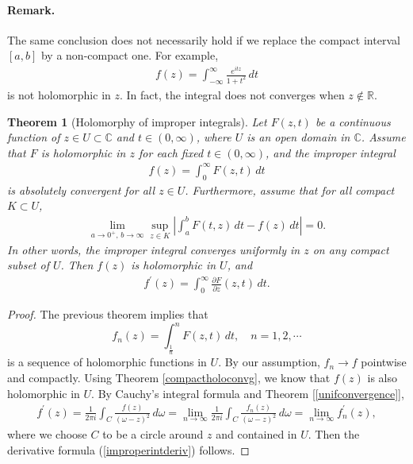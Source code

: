 \documentclass{article}
\numberwithin{equation}{section}
\newcommand{\bbC}{\mathbb{C}}
\newcommand{\bbR}{\mathbb{R}}
\theoremstyle{plain}
\newtheorem{theorem}{Theorem}[section]
\theoremstyle{definition}
\begin{document}
\paragraph{Remark.} The same conclusion does not necessarily hold if we replace the compact interval $[a,b]$ by a non-compact one. For example,
\begin{align*}
	f(z)=\int_{-\infty}^\infty\frac{e^{itz}}{1+t^2}\,dt
\end{align*}
is not holomorphic in $z$. In fact, the integral does not converges when $z\notin \bbR$.
\begin{theorem}[Holomorphy of improper integrals]\label{compactconvgint}
Let $F(z,t)$ be a continuous function of $z\in U\subset\bbC$ and $t\in(0,\infty)$, where $U$ is an open domain in $\bbC$. Assume that $F$ is holomorphic in $z$ for each fixed $t\in(0,\infty)$, and the improper integral
\begin{align*}
	f(z)=\int_0^\infty F(z,t)\,dt
\end{align*}
is absolutely convergent for all $z\in U$. Furthermore, assume that for all compact $K\subset U$,
\begin{align*}
	\lim_{a\to 0^+,\,b\to\infty}\sup_{z\in K}\left\vert\int_a^b F(t,z)\,dt-f(z)\,dt\right\vert=0.
\end{align*}
In other words, the improper integral converges uniformly in $z$ on any compact subset of $U$. Then $f(z)$ is holomorphic in $U$, and
\begin{align}
	f^\prime(z)=\int_0^\infty\frac{\partial F}{\partial z}(z,t)\,dt.\label{improperintderiv}
\end{align}
\end{theorem}
\begin{proof}
The previous theorem implies that $$f_n(z)=\int_{\frac{1}{n}}^n F(z,t)\,dt,\quad n=1,2,\cdots$$ is a sequence of holomorphic functions in $U$. By our assumption, $f_n\to f$ pointwise and compactly. Using Theorem \ref{compactholoconvg}, we know that $f(z)$ is also holomorphic in $U$. By Cauchy's integral formula and Theorem [\ref{unifconvergence}],
\begin{align*}
	f^\prime(z)=\frac{1}{2\pi i}\int_C\frac{f(z)}{(\omega-z)^2}\,d\omega=\lim_{n\to\infty}\frac{1}{2\pi i}\int_C\frac{f_n(z)}{(\omega-z)^2}\,d\omega=\lim_{n\to\infty} f_n^\prime(z),
\end{align*}
where we choose $C$ to be a circle around $z$ and contained in $U$. Then the derivative formula (\ref{improperintderiv}) follows.
\end{proof}
\end{document}

